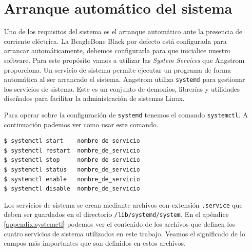 \section{Arranque automático del sistema}
	Uno de los requisitos del sistema es el arranque automático ante la presencia de corriente eléctrica. La BeagleBone Black por defecto está
	configurada para arrancar automáticamente, debemos configurarla para que inicialice nuestro software. Para este propósito vamos a utilizar las
	\emph{System Services}\cite{AngSystemctl} que Angstrom proporciona. Un servicio de sistema permite ejecutar un programa de forma automática al
	ser arrancado el sistema. Angstrom utiliza \texttt{systemd}\cite{systemdWiki} para gestionar los servicios de sistema.  Este es un conjunto de
	demonios, librerías y utilidades diseñados para facilitar la administración de sistemas Linux.
	\par
	Para operar sobre la configuración de \texttt{systemd} tenemos el comando \texttt{systemctl}. A continuación podemos ver como usar este
	comando.
	\begin{lstlisting}[style=myBash]
$ systemctl start    nombre_de_servicio
$ systemctl restart  nombre_de_servicio
$ systemctl stop     nombre_de_servicio
$ systemctl status   nombre_de_servicio
$ systemctl enable   nombre_de_servicio
$ systemctl disable  nombre_de_servicio
	\end{lstlisting}
	\par
	Los servicios de sistema se crean mediante archivos con extensión \texttt{.service} que deben ser guardados en el directorio
	\texttt{/lib/systemd/system}. En el apéndice \ref{appendix:systemctl} podemos ver el contenido de los archivos que definen los cuatro
	servicios de sistema utilizados en este trabajo. Veamos el significado de lo campos más importantes que son definidos en estos archivos.

